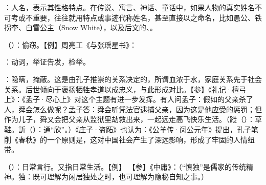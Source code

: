{
\item {}：人名，表示其性格特点。在传说、寓言、神话、童话中，如果人物的真实姓名不可考或不重要，往往就用特点或事迹代称姓名，甚至直接以之命名，比如愚公、铁拐李、白雪公主（Snow White），以及后文的、。
\item {}（）：偷窃。【例】周亮工《与张瑶星书》：
\item {}：动词，举证告发，检举。
\item {}：隐瞒，掩蔽。这是由孔子推崇的关系决定的，所谓血浓于水，家庭关系先于社会关系。后世倾向于褒扬牺牲孝道以成忠义，与此形成对比。【参】《礼记·檀弓上》：《孟子·尽心上》对这个主题有进一步发挥。有人问孟子：假如的父亲杀了人，舜会怎么做呢？孟子答：舜会听凭法官逮捕父亲，因为这是他应受的惩罚；但作为儿子，舜又会把父亲从监狱里劫救出来，一起远走高飞快乐生活。（蹝（）：草鞋。訢（）：通“欣”。）《庄子·盗跖》也认为：《公羊传·闵公元年》提出，孔子笔削《春秋》的一个原则是，这对中国社会产生了深远影响，形成了牢固的人情纽带。%
}
{}


{
\item {}（）：日常言行。又指日常生活。【例】 【参】《中庸》：（“慎独”是儒家的传统精神。独：既可理解为闲居独处之时，也可理解为隐秘自知之事。）
}
{}


